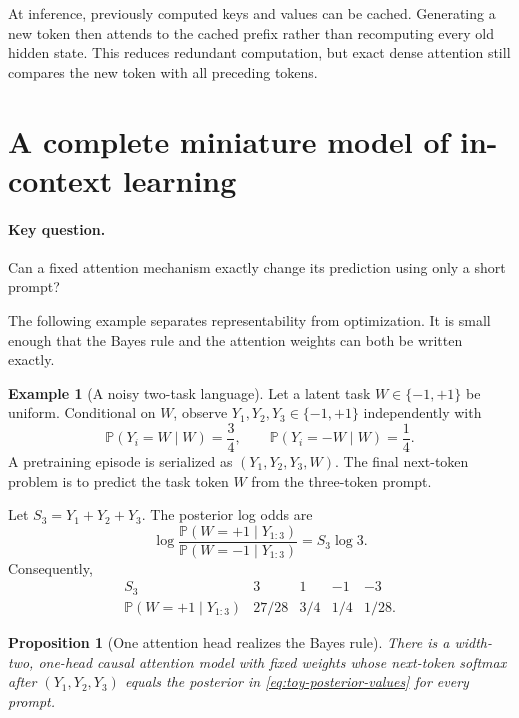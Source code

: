 \documentclass[11pt]{amsart}
\numberwithin{equation}{section}
\theoremstyle{definition}
\newtheorem{example}[definition]{Example}
\theoremstyle{plain}
\newtheorem{proposition}[definition]{Proposition}
\theoremstyle{remark}
\newcommand{\Prob}{\mathbb{P}}
\begin{document}
At inference, previously computed keys and values can be cached.  Generating a
new token then attends to the cached prefix rather than recomputing every old
hidden state.  This reduces redundant computation, but exact dense attention
still compares the new token with all preceding tokens.


\section{A complete miniature model of in-context learning}
\label{sec:toy-icl}

\paragraph{\textbf{Key question.}}
Can a fixed attention mechanism exactly change its prediction using only a
short prompt?

The following example separates representability from optimization.  It is
small enough that the Bayes rule and the attention weights can both be written
exactly.

\begin{example}[A noisy two-task language]
\label{ex:noisy-task}
Let a latent task $W\in\{-1,+1\}$ be uniform.  Conditional on $W$, observe
$Y_1,Y_2,Y_3\in\{-1,+1\}$ independently with
\begin{equation}\label{eq:noisy-task-law}
 \Prob(Y_i=W\mid W)=\frac34,
 \qquad
 \Prob(Y_i=-W\mid W)=\frac14.
\end{equation}
A pretraining episode is serialized as $(Y_1,Y_2,Y_3,W)$.  The final
next-token problem is to predict the task token $W$ from the three-token
prompt.
\end{example}

Let $S_3=Y_1+Y_2+Y_3$.  The posterior log odds are
\begin{equation}\label{eq:toy-posterior-odds}
 \log\frac{\Prob(W=+1\mid Y_{1:3})}
          {\Prob(W=-1\mid Y_{1:3})}
 =S_3\log 3.
\end{equation}
Consequently,
\begin{equation}\label{eq:toy-posterior-values}
\begin{array}{c|cccc}
S_3&3&1&-1&-3\\ \hline
\Prob(W=+1\mid Y_{1:3})
&27/28&3/4&1/4&1/28.
\end{array}
\end{equation}

\begin{proposition}[One attention head realizes the Bayes rule]
\label{prop:toy-attention-bayes}
There is a width-two, one-head causal attention model with fixed weights whose
next-token softmax after $(Y_1,Y_2,Y_3)$ equals the posterior in
\eqref{eq:toy-posterior-values} for every prompt.
\end{proposition}
\end{document}
